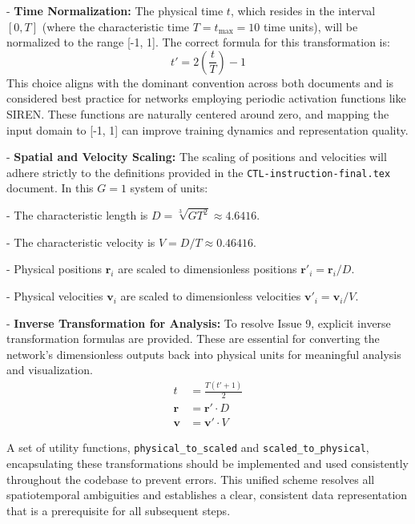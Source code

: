 - \textbf{Time Normalization:} The physical time $t$, which resides in the interval $[0, T]$ (where the characteristic time $T = t_{\max} = 10$ time units), will be normalized to the range [-1, 1]. The correct formula for this transformation is:
    \begin{equation}
        t' = 2 \left( \frac{t}{T} \right) - 1
    \end{equation}
    This choice aligns with the dominant convention across both documents and is considered best practice for networks employing periodic activation functions like SIREN. These functions are naturally centered around zero, and mapping the input domain to [-1, 1] can improve training dynamics and representation quality.


- \textbf{Spatial and Velocity Scaling:} The scaling of positions and velocities will adhere strictly to the definitions provided in the \texttt{CTL-instruction-final.tex} document. In this $G=1$ system of units:


- The characteristic length is $D = \sqrt[3]{G T^2} \approx 4.6416$.

- The characteristic velocity is $V = D / T \approx 0.46416$.

- Physical positions $\mathbf{r}_i$ are scaled to dimensionless positions $\mathbf{r}'_i = \mathbf{r}_i / D$.

- Physical velocities $\mathbf{v}_i$ are scaled to dimensionless velocities $\mathbf{v}'_i = \mathbf{v}_i / V$.



- \textbf{Inverse Transformation for Analysis:} To resolve Issue 9, explicit inverse transformation formulas are provided. These are essential for converting the network's dimensionless outputs back into physical units for meaningful analysis and visualization.
    \begin{align}
        t &= \frac{T(t' + 1)}{2} \\
        \mathbf{r} &= \mathbf{r}' \cdot D \\
        \mathbf{v} &= \mathbf{v}' \cdot V
    \end{align}

A set of utility functions, \texttt{physical\_to\_scaled} and \texttt{scaled\_to\_physical}, encapsulating these transformations should be implemented and used consistently throughout the codebase to prevent errors. This unified scheme resolves all spatiotemporal ambiguities and establishes a clear, consistent data representation that is a prerequisite for all subsequent steps.

